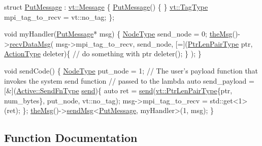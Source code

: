 \begin{DoxyCode}
\textcolor{keyword}{struct }\hyperlink{namespacevt_1_1rdma_ae0a0330c647ec5ac5d508750f4cd4a06}{PutMessage} : \hyperlink{structvt_1_1messaging_1_1_active_msg}{vt::Message} \{
  \hyperlink{namespacevt_1_1rdma_ae0a0330c647ec5ac5d508750f4cd4a06}{PutMessage}() \{ \}
  \hyperlink{namespacevt_a84ab281dae04a52a4b243d6bf62d0e52}{vt::TagType} mpi\_tag\_to\_recv = vt::no\_tag;
\};

\textcolor{keywordtype}{void} myHandler(\hyperlink{namespacevt_1_1rdma_ae0a0330c647ec5ac5d508750f4cd4a06}{PutMessage}* msg) \{
  \hyperlink{namespacevt_a866da9d0efc19c0a1ce79e9e492f47e2}{NodeType} send\_node = 0;
  \hyperlink{namespacevt_aeafd31f866aeb4dc6fc2f6ee97136350}{theMsg}()->\hyperlink{structvt_1_1messaging_1_1_active_messenger_a9dc244ad2e4fbb24a7bb0b0cd2ef0b61}{recvDataMsg}(
    msg->mpi\_tag\_to\_recv, send\_node,
    [=](\hyperlink{namespacevt_a97f320a1d3b9b4035e591671cd7d10f0}{PtrLenPairType} ptr, \hyperlink{namespacevt_ae0a5a7b18cc99d7b732cb4d44f46b0f3}{ActionType} deleter)\{
       \textcolor{comment}{// do something with ptr}
       deleter();
    \}
  );
\}

\textcolor{keywordtype}{void} sendCode() \{
  \hyperlink{namespacevt_a866da9d0efc19c0a1ce79e9e492f47e2}{NodeType} put\_node = 1;
  \textcolor{comment}{// The user's payload function that invokes the system send function}
  \textcolor{comment}{// passed to the lambda}
  \textcolor{keyword}{auto} send\_payload = [&](\hyperlink{structvt_1_1messaging_1_1_active_messenger_a09efd64a8c1bc26a7333c70b76ca01bd}{Active::SendFnType} \hyperlink{group__typesafehan_ga4557b5ce74c8c5df0013cf49738517bf}{send})\{
    \textcolor{keyword}{auto} ret = \hyperlink{group__typesafehan_ga4557b5ce74c8c5df0013cf49738517bf}{send}(\hyperlink{namespacevt_a97f320a1d3b9b4035e591671cd7d10f0}{vt::PtrLenPairType}\{ptr, num\_bytes\}, put\_node, vt::no\_tag);
    msg->mpi\_tag\_to\_recv = std::get<1>(ret);
  \};
  \hyperlink{namespacevt_aeafd31f866aeb4dc6fc2f6ee97136350}{theMsg}()->\hyperlink{group__preregister_ga0162a39473e7f9b490a79a7983d949ac}{sendMsg}<\hyperlink{namespacevt_1_1rdma_ae0a0330c647ec5ac5d508750f4cd4a06}{PutMessage}, myHandler>(1, msg);
\}
\end{DoxyCode}
 

\subsection{Function Documentation}
\mbox{\label{group__sendpayload_ga9417950068f8ceed85f1b5ef53f3ad27}} 

